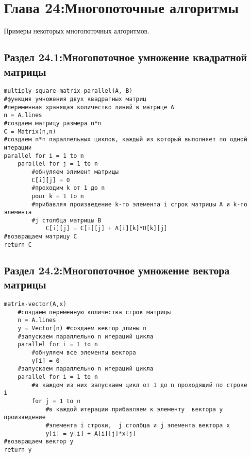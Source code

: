 \chapter*{Глава 24:Многопоточные алгоритмы}

Примеры некоторых многопоточных алгоритмов.

\section*{Раздел 24.1:Многопоточное умножение квадратной матрицы}

\begin{tcolorbox}
\begin{verbatim}
multiply-square-matrix-parallel(A, B) 
#функция умножения двух квадратных матриц
#переменная хранящая количество линий в матрице А
n = A.lines
#создаем матрицу размера n*n
C = Matrix(n,n) 
#создаем n*n параллельных циклов, каждый из который выполняет по одной итерации
parallel for i = 1 to n
    parallel for j = 1 to n
        #обнуляем элимент матрицы
        C[i][j] = 0
        #проходим k от 1 до n
        pour k = 1 to n
        #прибавляя произведение k-го элемента i строк матрицы A и k-го элемента 
        #j столбца матрицы B
            C[i][j] = C[i][j] + A[i][k]*B[k][j]
#возвращаем матрицу С
return C
\end{verbatim}
\end{tcolorbox}

\section*{Раздел 24.2:Многопоточное умножение вектора матрицы}

\begin{tcolorbox}
\begin{verbatim}
matrix-vector(A,x)
    #создаем переменную количества строк матрицы
    n = A.lines
    y = Vector(n) #создаем вектор длины n
    #запускаем параллельно n итераций цикла
    parallel for i = 1 to n
        #обнуляем все элементы вектора
        y[i] = 0
    #запускаем параллельно n итераций цикла
    parallel for i = 1 to n
        #в каждом из них запускаем цикл от 1 до n проходящий по строке i
        for j = 1 to n
            #в каждой итерации прибавляем к элементу  вектора y произведение 
            #элемента i строки,  j столбца и j элемента вектора x
            y[i] = y[i] + A[i][j]*x[j]
#возвращаем вектор y
return y
\end{verbatim}
\end{tcolorbox}

